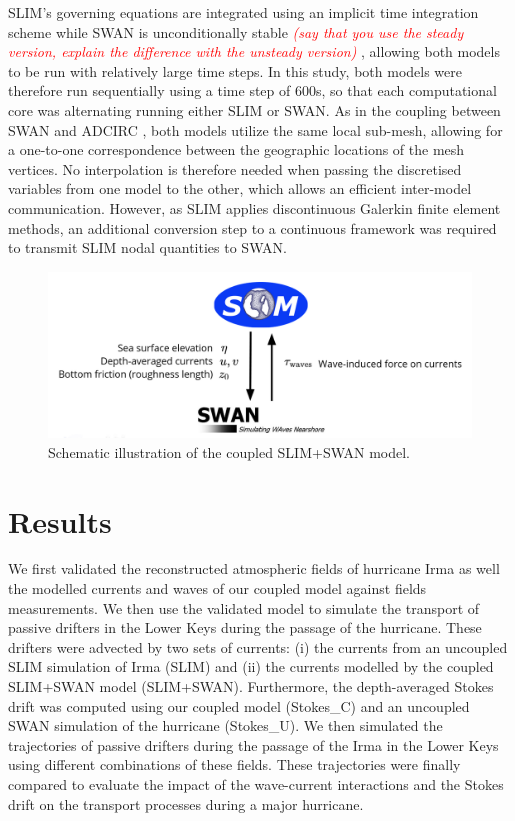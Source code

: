 \documentclass[11pt,a4paper]{article}
\newcommand{\emphc}[1]{\emph{\textcolor{red}{#1}}}
\begin{document}
SLIM's governing equations are integrated using an implicit time integration scheme while SWAN is unconditionally stable \emphc{(say that you use the steady version, explain the difference with the unsteady version)} \citep{dietrich2010high}, allowing both models to be run with relatively large time steps. In this study, both models were therefore run sequentially using a time step of 600s, so that each computational core was alternating running either SLIM or SWAN. As in the coupling between SWAN and ADCIRC \citep{dietrich2010high}, both models utilize the same local sub-mesh, allowing for a one-to-one correspondence between the geographic locations of the mesh vertices. No interpolation is therefore needed when passing the discretised variables from one model to the other, which allows an efficient inter-model communication. However, as SLIM applies discontinuous Galerkin finite element methods, an additional conversion step to a continuous framework was required to transmit SLIM nodal quantities to SWAN.  

\begin{figure}
    \centering
    \includegraphics[width=.95\textwidth]{fig/coupling.png}
    \caption{Schematic illustration of the coupled SLIM+SWAN model.}
    \label{fig:coupling}
\end{figure}
 

\section{Results}

We first validated the reconstructed atmospheric fields of hurricane Irma as well the modelled currents and waves of our coupled model against fields measurements. We then use the validated model to simulate the transport of passive drifters in the Lower Keys during the passage of the hurricane. These drifters were advected by two sets of currents: (i) the currents from an uncoupled SLIM simulation of Irma (SLIM) and (ii) the currents modelled by the coupled SLIM+SWAN model (SLIM+SWAN). Furthermore, the depth-averaged Stokes drift was computed using our coupled model (Stokes\_C) and an uncoupled SWAN simulation of the hurricane (Stokes\_U). We then simulated the trajectories of passive drifters during the passage of the Irma in the Lower Keys using different combinations of these fields. These trajectories were finally compared to evaluate the impact of the wave-current interactions and the Stokes drift on the transport processes during a major hurricane.
\end{document}
